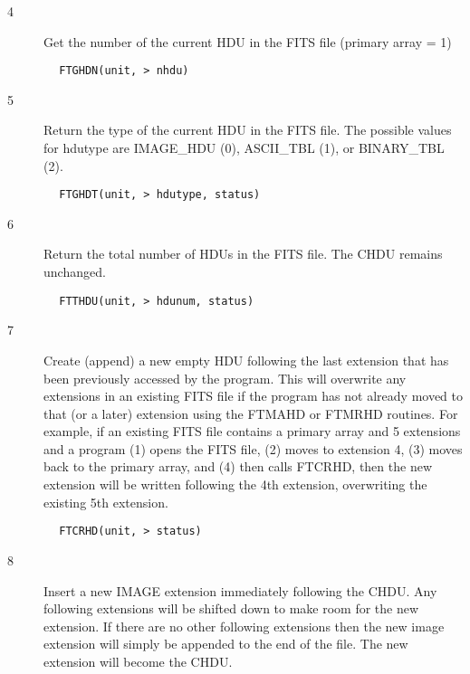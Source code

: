 \documentclass[11pt]{book}
\begin{document}
\begin{description}
\item[4 ]Get the number of the current HDU in the FITS file (primary array = 1)
\end{description}

\begin{verbatim}
        FTGHDN(unit, > nhdu)
\end{verbatim}

\begin{description}
\item[5 ] Return the type of the current HDU in the FITS file.  The possible
   values for hdutype are IMAGE\_HDU (0), ASCII\_TBL (1), or BINARY\_TBL (2).
\end{description}

\begin{verbatim}
        FTGHDT(unit, > hdutype, status)
\end{verbatim}

\begin{description}
\item[6 ] Return the total number of HDUs in the FITS file.
   The CHDU remains unchanged.
\end{description}

\begin{verbatim}
        FTTHDU(unit, > hdunum, status)
\end{verbatim}

\begin{description}
\item[7 ]Create (append) a new empty HDU following the last extension that
    has been previously accessed by the program.   This will overwrite
    any extensions in an existing FITS file if the program has not already
    moved to that (or a later) extension using the FTMAHD or FTMRHD routines.
    For example, if an existing FITS file contains a primary array and 5
    extensions and a program (1) opens the FITS file, (2) moves to
    extension 4, (3) moves back to the primary array, and (4) then calls
    FTCRHD, then the new extension will be written following the 4th
   extension, overwriting the existing 5th extension.
\end{description}

\begin{verbatim}
        FTCRHD(unit, > status)
\end{verbatim}

\begin{description}
\item[8 ] Insert a new IMAGE extension immediately following the CHDU.
    Any following extensions will be shifted down to make room for
    the new extension.  If there are no other following extensions
    then the new image extension will simply be appended to the
   end of the file.  The new extension will become the CHDU.
\end{description}
\end{document}
